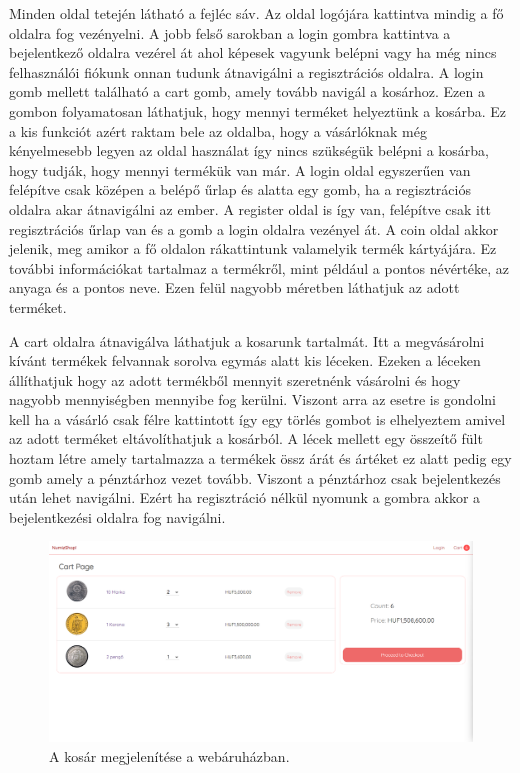 Minden oldal tetején látható a fejléc sáv. Az oldal logójára kattintva mindig a fő oldalra fog vezényelni. A jobb felső sarokban a login gombra kattintva a bejelentkező oldalra vezérel át ahol képesek vagyunk belépni vagy ha még nincs felhasználói fiókunk onnan tudunk átnavigálni a regisztrációs oldalra. A login gomb mellett található a cart gomb, amely tovább navigál a kosárhoz. Ezen a gombon folyamatosan láthatjuk, hogy mennyi terméket helyeztünk a kosárba. Ez a kis funkciót azért raktam bele az oldalba, hogy a vásárlóknak még kényelmesebb legyen az oldal használat így nincs szükségük belépni a kosárba, hogy tudják, hogy mennyi termékük van már. A login oldal egyszerűen van felépítve csak középen a belépő űrlap és alatta egy gomb, ha a regisztrációs oldalra akar átnavigálni az ember. A register oldal is így van, felépítve csak itt regisztrációs űrlap van és a gomb a login oldalra vezényel át. A coin oldal akkor jelenik, meg amikor a fő oldalon rákattintunk valamelyik termék kártyájára. Ez további információkat tartalmaz a termékről, mint például a pontos névértéke, az anyaga és a pontos neve. Ezen felül nagyobb méretben láthatjuk az adott terméket.

A cart oldalra átnavigálva láthatjuk a kosarunk tartalmát. Itt a megvásárolni kívánt termékek felvannak sorolva egymás alatt kis léceken. Ezeken a léceken állíthatjuk hogy az adott termékből mennyit szeretnénk vásárolni és hogy nagyobb mennyiségben mennyibe fog kerülni. Viszont arra az esetre is gondolni kell ha a vásárló csak félre kattintott így egy törlés gombot is elhelyeztem amivel az adott terméket eltávolíthatjuk a kosárból. A lécek mellett egy összeítő fült hoztam létre amely tartalmazza a termékek össz árát és ártéket ez alatt pedig egy gomb amely a pénztárhoz vezet tovább. Viszont a pénztárhoz csak bejelentkezés után lehet navigálni. Ezért ha regisztráció nélkül nyomunk a gombra akkor a bejelentkezési oldalra fog navigálni.

\begin{figure}[h]
\centering
\includegraphics[scale=0.3]{images/cart.png}
\caption{A kosár megjelenítése a webáruházban.}
\label{fig:kosar}
\end{figure}

